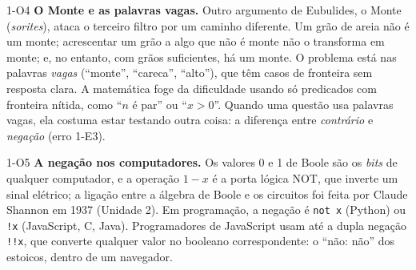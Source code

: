 \begin{obs}{1-O4}
\textbf{O Monte e as palavras vagas.} Outro argumento de Eubulides, o Monte (\emph{sorites}), ataca o terceiro filtro por um caminho diferente. Um grão de areia não é um monte; acrescentar um grão a algo que não é monte não o transforma em monte; e, no entanto, com grãos suficientes, há um monte. O problema está nas palavras \emph{vagas} (\enquote{monte}, \enquote{careca}, \enquote{alto}), que têm casos de fronteira sem resposta clara. A matemática foge da dificuldade usando só predicados com fronteira nítida, como \enquote{$n$ é par} ou \enquote{$x>0$}. Quando uma questão usa palavras vagas, ela costuma estar testando outra coisa: a diferença entre \emph{contrário} e \emph{negação} (erro 1-E3).
\end{obs}

\begin{obs}{1-O5}
\textbf{A negação nos computadores.} Os valores 0 e 1 de Boole são os \emph{bits} de qualquer computador, e a operação $1-x$ é a porta lógica NOT, que inverte um sinal elétrico; a ligação entre a álgebra de Boole e os circuitos foi feita por Claude Shannon em 1937 (Unidade 2). Em programação, a negação é \texttt{not x} (Python) ou \texttt{!x} (JavaScript, C, Java). Programadores de JavaScript usam até a dupla negação \texttt{!!x}, que converte qualquer valor no booleano correspondente: o \enquote{não: não} dos estoicos, dentro de um navegador.
\end{obs}

\Exemplos

